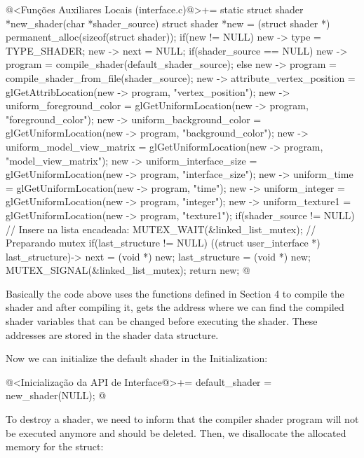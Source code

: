 \iniciocodigo
@<Funções Auxiliares Locais (interface.c)@>+=
static struct shader *new_shader(char *shader_source){
  struct shader *new = (struct shader *) permanent_alloc(sizeof(struct shader));
  if(new != NULL){
    new -> type = TYPE_SHADER;
    new -> next = NULL;
    if(shader_source == NULL)
      new -> program = compile_shader(default_shader_source);
    else
      new -> program = compile_shader_from_file(shader_source);
    new -> attribute_vertex_position = glGetAttribLocation(new -> program,
                                                           "vertex_position");
    new -> uniform_foreground_color =  glGetUniformLocation(new -> program,
                                                            "foreground_color");
    new -> uniform_background_color =  glGetUniformLocation(new -> program,
                                                            "background_color");
    new -> uniform_model_view_matrix = glGetUniformLocation(new -> program,
                                                            "model_view_matrix");
    new -> uniform_interface_size = glGetUniformLocation(new -> program,
                                                         "interface_size");
    new -> uniform_time = glGetUniformLocation(new -> program, "time");
    new -> uniform_integer = glGetUniformLocation(new -> program, "integer");
    new -> uniform_texture1 = glGetUniformLocation(new -> program, "texture1");
    if(shader_source != NULL){ // Insere na lista encadeada:
      MUTEX_WAIT(&linked_list_mutex); // Preparando mutex
      if(last_structure != NULL)
        ((struct user_interface *) last_structure)-> next = (void *) new;
      last_structure = (void *) new;
      MUTEX_SIGNAL(&linked_list_mutex);
    }
  }
  return new;
}
@
\fimcodigo

Basically the code above uses the functions defined in Section 4 to
compile the shader and after compiling it, gets the address where we
can find the compiled shader variables that can be changed before
executing the shader. These addresses are stored in the shader data
structure.

Now we can initialize the default shader in the Initialization:

\iniciocodigo
@<Inicialização da API de Interface@>+=
default_shader = new_shader(NULL);
@
\fimcodigo

To destroy a shader, we need to inform that the compiler shader
program will not be executed anymore and should be deleted. Then, we
disallocate the allocated memory for the struct:

